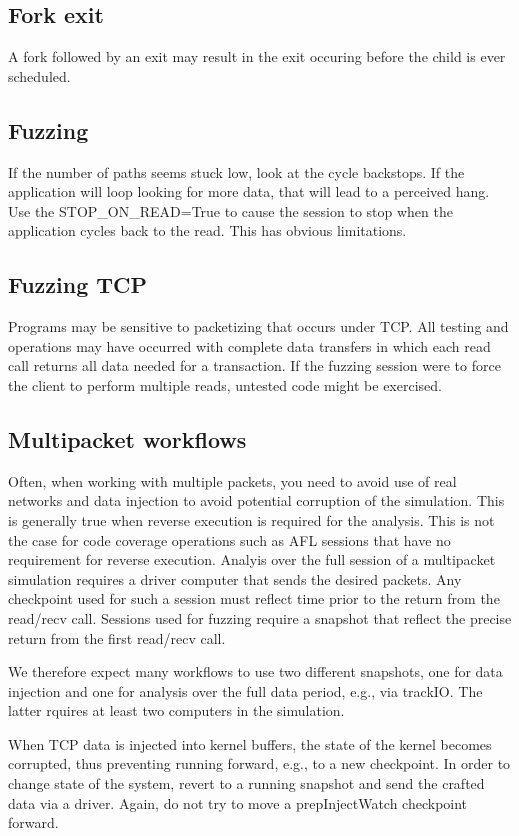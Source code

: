 \documentclass[titlepage]{article}
\begin{document}
\begin{appendices}
\subsection{Fork exit}
A fork followed by an exit may result in the exit occuring before the child is ever scheduled.

\subsection{Fuzzing}
If the number of paths seems stuck low, look at the cycle backstops.  If the application will loop looking for more data, that will lead to a perceived
hang.  Use the STOP\_ON\_READ=True to cause the session to stop when the application cycles back to the read.  This has obvious limitations.
\subsection{Fuzzing TCP}
Programs may be sensitive to packetizing that occurs under TCP.  All testing and operations may have occurred with
complete data transfers in which each read call returns all data needed for a transaction.  If the fuzzing session
were to force the client to perform multiple reads, untested code might be exercised.

\subsection{Multipacket workflows}
Often, when working with multiple packets, you need to avoid use of real networks and data injection to avoid potential corruption of the simulation.
This is generally true when reverse execution is required for the analysis.  This is not the case for code coverage operations such as AFL sessions that
have no requirement for reverse execution.  Analyis over the full session of a multipacket simulation requires a driver computer that sends the desired
packets.  Any checkpoint used for such a session must reflect time prior to the return from the read/recv call.  Sessions used for fuzzing 
require a snapshot that reflect the precise return from the first read/recv call.  

We therefore expect many workflows to use two different snapshots, one for data injection and one for analysis over the full data period, e.g., via trackIO.
The latter rquires at least two computers in the simulation.  

When TCP data is injected into kernel buffers, the state of the kernel becomes corrupted, thus preventing running forward, e.g., to a new checkpoint.
In order to change state of the system, revert to a running snapshot and send the crafted data via a driver.  Again, do not try to move a prepInjectWatch
checkpoint forward.


\end{appendices}
\end{document}
